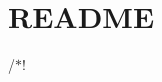 \chapter{README }
\hypertarget{md__r_e_a_d_m_e}{}\label{md__r_e_a_d_m_e}
/\texorpdfstring{$\ast$}{*}! 
